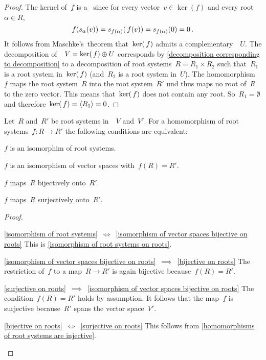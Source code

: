 \begin{proof}
  The kernel of~$f$ is a~{} since for every vector~$v \in \ker(f)$ and every root~$\alpha \in R$,
  \[
    f( s_\alpha(v) )
    =
    s_{f(\alpha)}(\, f(v))
    =
    s_{f(\alpha)}(0)
    =
    0 \,.
  \]
  It follows from Maschke’s~theorem that~$\ker(\, f)$ admits a complementary~{}~$U$.
  The decomposition of~{}~$V = \ker(\, f) \oplus U$ corresponds by \cref{decomposition corresponding to decomposition} to a decomposition of root systems~$R = R_1 \times R_2$ such that~$R_1$ is a root system in~$\ker(\, f)$ (and~$R_2$ is a root system in~$U$).
  The homomorphism~$f$ maps the root system~$R$ into the root system~$R'$ und thus maps no root of~$R$ to the zero vector.
  This means that~$\ker(\, f)$ does not contain any root.
  So~$R_1 = \emptyset$ and therefore~$\ker(\, f) = \langle R_1\rangle = 0$.
\end{proof}


\begin{corollary}
  Let~$R$ and~$R'$ be root systems in~{\vectorspaces{$\kf$}}~$V$ and~$V'$.
  For a homomorphism of root systems~$f \colon R \to R'$ the following conditions are equivalent:
  \begin{equivalenceslist}
    \item
      \label{isomorphism of root systems}
      $f$ is an isomorphim of root systems.
    \item
      \label{isomorphism of vector spaces bijective on roots}
      $f$ is an isomorphism of vector spaces with~$f(R) = R'$.
    \item
      \label{bijective on roots}
      $f$ maps~$R$ bijectively onto~$R'$.
    \item
      \label{surjective on roots}
      $f$ maps~$R$ surjectively onto~$R'$.
  \end{equivalenceslist}
\end{corollary}


\begin{proof}
  \leavevmode
  \begin{implicationlist}
    \item[\ref*{isomorphism of root systems}~$\iff$~\ref*{isomorphism of vector spaces bijective on roots}]
      This is \cref{isomorphism of root systems on roots}.
    \item[\ref*{isomorphism of vector spaces bijective on roots}~$\implies$~\ref*{bijective on roots}]
      The restriction of~$f$ to a map~$R \to R'$ is again bijective because~$f(R) = R'$.
    \item[\ref*{surjective on roots}~$\implies$~\ref*{isomorphism of vector spaces bijective on roots}]
      The condition~$f(R) = R'$ holds by assumption.
      It follows that the map~$f$ is surjective because~$R'$ spans the vector space~$V'$.
    \item[\ref*{bijective on roots}~$\iff$~\ref*{surjective on roots}]
      This follows from \cref{homomorphisms of root systems are injective}.
    \qedhere
  \end{implicationlist}
\end{proof}


